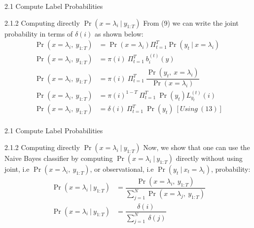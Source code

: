 \documentclass{beamer}
\providecommand{\pr}[1]{\ensuremath{\Pr\left(#1\right)}}
\begin{document}
\begin{frame}{2.1 Compute Label Probabilities}
\begin{block}{2.1.2 Computing directly $\pr{x = \lambda_i\ |\ y_{1:T}}$}
    From (9) we can write the joint probability in terms of $\delta(i)$ as shown below:
    \begin{equation}
        \begin{split}
            \pr{x=\lambda_i,\ y_{1:T}} &= \pr{x=\lambda_i}\Pi_{t=1}^{T} \pr{y_t\ |\ x=\lambda_i}\\
            \pr{x=\lambda_i,\ y_{1:T}} &= \pi(i)\ \Pi_{t=1}^{T}\ b_{i}^{(t)}(y)\\
            \pr{x=\lambda_i,\ y_{1:T}} &= \pi(i)\ \Pi_{t=1}^{T}\ \dfrac{\pr{y_t,\ x=\lambda_i}}{\pr{x=\lambda_i}}\\
            \pr{x=\lambda_i,\ y_{1:T}} &= \pi(i)^{1-T}\ \Pi_{t=1}^{T}\ \pr{y_t} L_{y_t}^{(t)}(i)\\
            \pr{x=\lambda_i,\ y_{1:T}} &= \delta(i)\ \Pi_{t=1}^{T}\ \pr{y_t}\ [Using\ (13)]\\
        \end{split}
    \end{equation}
\end{block}
\end{frame}
\begin{frame}{2.1 Compute Label Probabilities}
\begin{block}{2.1.2 Computing directly $\pr{x = \lambda_i\ |\ y_{1:T}}$}
Now, we show that one can use the Naive Bayes classifier by computing $\pr{x = \lambda_i\ |\ y_{1:T}}$ directly without using joint, i.e $\pr{x=\lambda_i,\ y_{1:T}}$, or observational, i.e $\pr{y_t\ |\ x_t = \lambda_i}$, probability: 
    \begin{equation}
        \begin{split}
             \pr{x=\lambda_i\ |\ y_{1:T}} &= \dfrac{\pr{x=\lambda_i,\ y_{1:T}}}{\sum_{j=1}^{N}\pr{x=\lambda_j,\ y_{1:T}}}\\
            \pr{x=\lambda_i\ |\ y_{1:T}} &= \dfrac{\delta(i)}{\sum_{j=1}^{N}\ \delta(j)}\\
        \end{split}
    \end{equation}
\end{block}
\end{frame}
\end{document}
